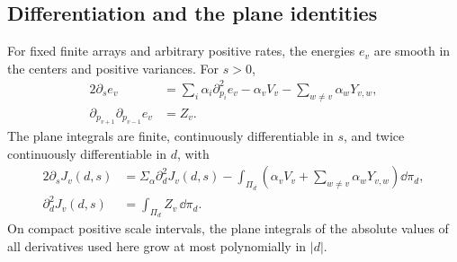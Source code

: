 \subsection{Differentiation and the plane identities}

\begin{lemma}\label{lem:heat-identities}
For fixed finite arrays and arbitrary positive rates, the energies $e_v$
are smooth in the centers and positive variances.  For $s>0$,
\begin{align}
 2\partial_s e_v
 &=\sum_i\alpha_i\partial_{p_i}^2e_v
   -\alpha_vV_v-\sum_{w\ne v}\alpha_wY_{v,w},
   \label{eq:heat-identity}\\
 \partial_{p_{v+1}}\partial_{p_{v-1}}e_v&=Z_v.
   \label{eq:heat-mixed}
\end{align}
The plane integrals are finite, continuously differentiable in $s$, and
twice continuously differentiable in $d$, with
\begin{equation}\label{eq:heat-plane-identities}
 \begin{aligned}
 2\partial_sJ_v(d,s)
 &=\Sigma_\alpha\partial_d^2J_v(d,s)
   -\int_{\Pi_d}\left(\alpha_vV_v+
                  \sum_{w\ne v}\alpha_wY_{v,w}\right)\dd\pi_d,\\
 \partial_d^2J_v(d,s)&=\int_{\Pi_d}Z_v\,\dd\pi_d.
 \end{aligned}
\end{equation}
On compact positive scale intervals, the plane integrals of the absolute
values of all derivatives used here grow at most polynomially in $|d|$.
\end{lemma}

